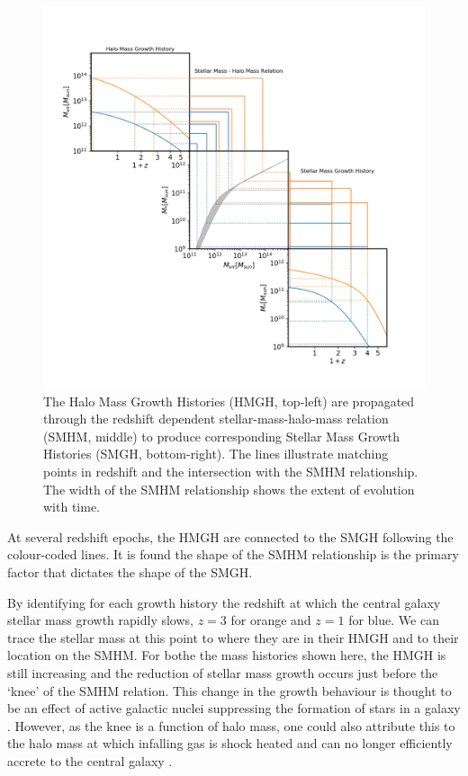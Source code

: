 \begin{figure}[h]
    \centering
    \includegraphics[width = \linewidth]{Figures/Chapter2/HMGH_to_SMGH.png}
    \caption{The Halo Mass Growth Histories (HMGH, top-left) are propagated through the redshift dependent stellar-mass-halo-mass relation (SMHM, middle) to produce corresponding Stellar Mass Growth Histories (SMGH, bottom-right). The lines illustrate matching points in redshift and the intersection with the SMHM relationship. The width of the SMHM relationship shows the extent of evolution with time.}
    \label{fig:Cent_Mass_PP}
\end{figure}

At several redshift epochs, the HMGH are connected to the SMGH following the colour-coded lines. It is found the shape of the SMHM relationship is the primary factor that dictates the shape of the SMGH. 


By identifying for each growth history the redshift at which the central galaxy stellar mass growth rapidly slows, $z = 3$ for orange and $z = 1$ for blue. We can trace the stellar mass at this point to where they are in their HMGH and to their location on the SMHM. For bothe the mass histories shown here, the HMGH is still increasing and the reduction of stellar mass growth occurs just before the `knee' of the SMHM relation. This change in the growth behaviour is thought to be an effect of active galactic nuclei suppressing the formation of stars in a galaxy \cite[e.g.][]{Cattaneo2006ModellingMass, Barai2018QuasarGalaxies}. However, as the knee is a function of halo mass, one could also attribute this to the halo mass at which infalling gas is shock heated and can no longer efficiently accrete to the central galaxy \cite[e.g.][]{Cattaneo2006ModellingMass, Behroozi2013ONEFFICIENCY}.

